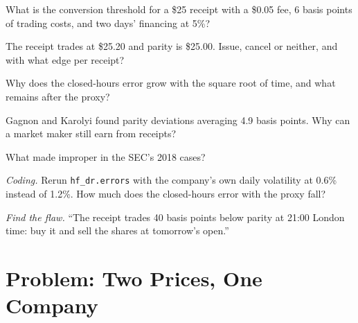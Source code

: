 \begin{exercise}[$\star$]\label{exo:hf:depositary-receipts-and-dual-listings:2}
What is the conversion threshold for a \$25 receipt with a \$0.05 fee, 6 basis points of trading costs, and two days' financing at 5\%?
\end{exercise}

\begin{exercise}[$\star$]\label{exo:hf:depositary-receipts-and-dual-listings:3}
The receipt trades at \$25.20 and parity is \$25.00. Issue, cancel or neither, and with what edge per receipt?
\end{exercise}

\begin{exercise}[$\star\star$]\label{exo:hf:depositary-receipts-and-dual-listings:4}
Why does the closed-hours error grow with the square root of time, and what remains after the proxy?
\end{exercise}

\begin{exercise}[$\star\star$]\label{exo:hf:depositary-receipts-and-dual-listings:5}
Gagnon and Karolyi found parity deviations averaging 4.9 basis points. Why can a market maker still earn from receipts?
\end{exercise}

\begin{exercise}[$\star\star$]\label{exo:hf:depositary-receipts-and-dual-listings:6}
What made  improper in the SEC's 2018 cases?
\end{exercise}

\begin{exercise}[$\star\star\star$]\label{exo:hf:depositary-receipts-and-dual-listings:7}
\emph{Coding.} Rerun \texttt{hf\_dr.errors} with the company's own daily volatility at 0.6\% instead of 1.2\%. How much does the closed-hours
error with the proxy fall?
\end{exercise}

\begin{exercise}[$\star\star\star$]\label{exo:hf:depositary-receipts-and-dual-listings:8}
\emph{Find the flaw.} ``The receipt trades 40 basis points below parity at 21:00 London time: buy it and sell the shares at tomorrow's open.''
\end{exercise}

\section{Problem: Two Prices, One Company}

